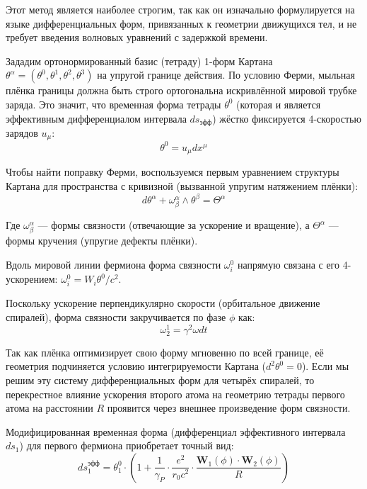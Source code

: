 \documentclass[12pt,a4paper]{article}
\begin{document}
Этот метод является наиболее строгим, так как он изначально формулируется на языке дифференциальных форм, привязанных к геометрии движущихся тел, и не требует введения волновых уравнений с задержкой времени.

Зададим ортонормированный базис (тетраду) 1-форм Картана $\theta^\alpha = (\theta^0, \theta^1, \theta^2, \theta^3)$ на упругой границе действия. По условию Ферми, мыльная плёнка границы должна быть строго ортогональна искривлённой мировой трубке заряда. Это значит, что временная форма тетрады $\theta^0$ (которая и является эффективным дифференциалом интервала $ds_{эфф}$) жёстко фиксируется 4-скоростью зарядов $u_\mu$:
\begin{equation}
\theta^0 = u_\mu dx^\mu
\end{equation}

Чтобы найти поправку Ферми, воспользуемся первым уравнением структуры Картана для пространства с кривизной (вызванной упругим натяжением плёнки):
\begin{equation}
d\theta^\alpha + \omega^\alpha_\beta \wedge \theta^\beta = \Theta^\alpha
\end{equation}

Где $\omega^\alpha_\beta$ — формы связности (отвечающие за ускорение и вращение), а $\Theta^\alpha$ — формы кручения (упругие дефекты плёнки).

Вдоль мировой линии фермиона форма связности $\omega^0_i$ напрямую связана с его 4-ускорением: $\omega^0_i = W_i \theta^0 / c^2$.

Поскольку ускорение перпендикулярно скорости (орбитальное движение спиралей), форма связности закручивается по фазе $\phi$ как:
\begin{equation}
\omega^1_2 = \gamma^2 \omega dt
\end{equation}

Так как плёнка оптимизирует свою форму мгновенно по всей границе, её геометрия подчиняется условию интегрируемости Картана ($d^2 \theta^0 = 0$). Если мы решим эту систему дифференциальных форм для четырёх спиралей, то перекрестное влияние ускорения второго атома на геометрию тетрады первого атома на расстоянии $R$ проявится через внешнее произведение форм связности.

Модифицированная временная форма (дифференциал эффективного интервала $ds_1$) для первого фермиона приобретает точный вид:
\begin{equation}
ds_1^{эфф} = \theta^0_1 \cdot \left( 1 + \frac{1}{\gamma_P} \cdot \frac{e^2}{r_0 c^2} \cdot \frac{\mathbf{W}_1(\phi) \cdot \mathbf{W}_2(\phi)}{R} \right)
\end{equation}
\end{document}
